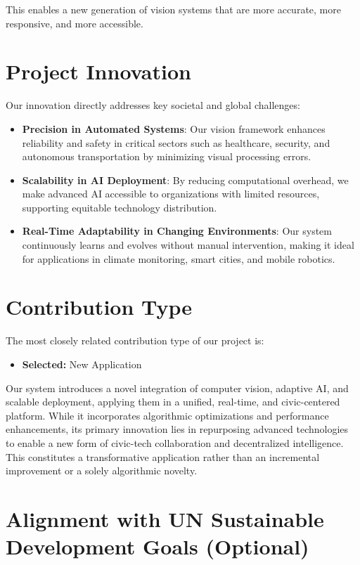 \documentclass[11pt, a4paper]{article}
\theoremstyle{plain}
\begin{document}
This enables a new generation of vision systems that are more accurate, more responsive, and more accessible.

\section*{Project Innovation}
Our innovation directly addresses key societal and global challenges:

\begin{itemize}
    \item \textbf{Precision in Automated Systems}: Our vision framework enhances reliability and safety in critical sectors such as healthcare, security, and autonomous transportation by minimizing visual processing errors.
    \item \textbf{Scalability in AI Deployment}: By reducing computational overhead, we make advanced AI accessible to organizations with limited resources, supporting equitable technology distribution.
    \item \textbf{Real-Time Adaptability in Changing Environments}: Our system continuously learns and evolves without manual intervention, making it ideal for applications in climate monitoring, smart cities, and mobile robotics.
\end{itemize}

\section*{Contribution Type}

The most closely related contribution type of our project is:

\begin{itemize}
    \item \textbf{Selected:} New Application
\end{itemize}

Our system introduces a novel integration of computer vision, adaptive AI, and scalable deployment, applying them in a unified, real-time, and civic-centered platform. While it incorporates algorithmic optimizations and performance enhancements, its primary innovation lies in repurposing advanced technologies to enable a new form of civic-tech collaboration and decentralized intelligence. This constitutes a transformative application rather than an incremental improvement or a solely algorithmic novelty.

\section*{Alignment with UN Sustainable Development Goals (Optional)}
\end{document}
